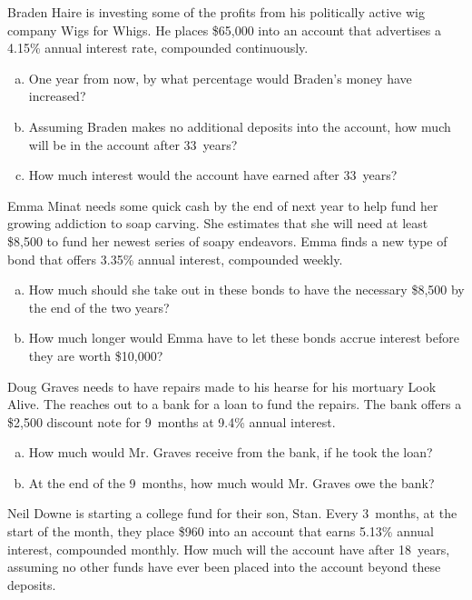 \documentclass[12pt,letterpaper]{exam}
\begin{document}
\begin{questions}
\newpage
\question[15] Braden Haire is investing some of the profits from his politically active wig company Wigs for Whigs. He places \$65,000 into an account that advertises a 4.15\% annual interest rate, compounded continuously. 
	\begin{enumerate}[(a)]
	\item One year from now, by what percentage would Braden's money have increased?
	\item Assuming Braden makes no additional deposits into the account, how much will be in the account after 33~years?
	\item How much interest would the account have earned after 33~years?
	\end{enumerate}



\newpage
\question[15] Emma Minat needs some quick cash by the end of next year to help fund her growing addiction to soap carving. She estimates that she will need at least \$8,500 to fund her newest series of soapy endeavors. Emma finds a new type of bond that offers 3.35\% annual interest, compounded weekly. 
	\begin{enumerate}[(a)]
	\item How much should she take out in these bonds to have the necessary \$8,500 by the end of the two years?
	\item How much longer would Emma have to let these bonds accrue interest before they are worth \$10,000?
	\end{enumerate}



\newpage
\question[15] Doug Graves needs to have repairs made to his hearse for his mortuary Look Alive. The reaches out to a bank for a loan to fund the repairs. The bank offers a \$2,500 discount note for 9~months at 9.4\% annual interest.
	\begin{enumerate}[(a)]
	\item How much would Mr. Graves receive from the bank, if he took the loan?
	\item At the end of the 9~months, how much would Mr. Graves owe the bank?
	\end{enumerate}



\newpage
\question[15] Neil Downe is starting a college fund for their son, Stan. Every 3~months, at the start of the month, they place \$960 into an account that earns 5.13\% annual interest, compounded monthly. How much will the account have after 18~years, assuming no other funds have ever been placed into the account beyond these deposits. 


\end{questions}
\end{document}
